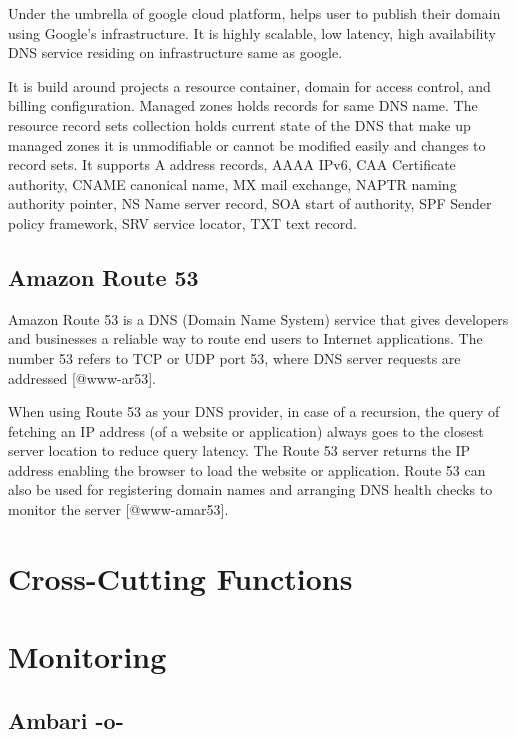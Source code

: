Under the umbrella of google cloud platform, helps user to publish
their domain using Google's infrastructure. It is highly scalable, low
latency, high availability DNS service residing on infrastructure same
as google.
   
It is build around projects a resource container, domain for access
control, and billing configuration. Managed zones holds records for
same DNS name. The resource record sets collection holds current state
of the DNS that make up managed zones it is unmodifiable or cannot be
modified easily and changes to record sets. It supports A address
records, AAAA IPv6, CAA Certificate authority, CNAME canonical name,
MX mail exchange, NAPTR naming authority pointer, NS Name server
record, SOA start of authority, SPF Sender policy framework, SRV
service locator, TXT text record.




\subsection{Amazon Route 53}

Amazon Route 53 is a DNS (Domain Name System) service that gives
developers and businesses a reliable way to route end users to
Internet applications. The number 53 refers to TCP or UDP port 53,
where DNS server requests are addressed [@www-ar53].
     
When using Route 53 as your DNS provider, in case of a recursion, the
query of fetching an IP address (of a website or application) always
goes to the closest server location to reduce query latency. The Route
53 server returns the IP address enabling the browser to load the
website or application. Route 53 can also be used for registering
domain names and arranging DNS health checks to monitor the
server [@www-amar53].

\section{Cross-Cutting Functions}

\section{Monitoring}

\subsection{Ambari -o-}

